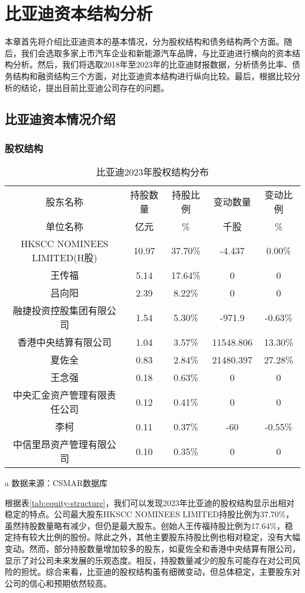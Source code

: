 \chapter{比亚迪资本结构分析}
本章首先将介绍比亚迪资本的基本情况，分为股权结构和债务结构两个方面。随后，我们会选取多家上市汽车企业和新能源汽车品牌，与比亚迪进行横向的资本结构分析。然后，我们将选取2018年至2023年的比亚迪财报数据，分析债务比率、债务结构和融资结构三个方面，对比亚迪资本结构进行纵向比较。最后，根据比较分析的结论，提出目前比亚迪公司存在的问题。
\section{比亚迪资本情况介绍}
\subsection{股权结构}
\begin{table}
  \centering
  \begin{threeparttable}[c]
    \caption{比亚迪2023年股权结构分布}
    \label{tab:equity-structure}
    \begin{tabular}{ccccc}
      \toprule
        股东名称 & 持股数量 & 持股比例 & 变动数量 & 变动比例 \\ 
        单位名称 & 亿元    &  \%      &  千股   &  \%      \\
      \midrule
        HKSCC NOMINEES LIMITED(H股) & 10.97  & 37.70\% & -4.437 & 0.00\% \\ 
        王传福 & 5.14  & 17.64\% & 0 & 0 \\ 
        吕向阳 & 2.39  & 8.22\% & 0 & 0 \\ 
        融捷投资控股集团有限公司 & 1.54  & 5.30\% & -971.9 & -0.63\% \\ 
        香港中央结算有限公司 & 1.04  & 3.57\% & 11548.806 & 13.30\% \\ 
        夏佐全 & 0.83  & 2.84\% & 21480.397 & 27.28\% \\ 
        王念强 & 0.18  & 0.63\% & 0 & 0 \\ 
        中央汇金资产管理有限责任公司 & 0.12  & 0.41\% & 0 & 0 \\ 
        李柯 & 0.11  & 0.37\% & -60 & -0.55\% \\ 
        中信里昂资产管理有限公司 & 0.10  & 0.35\% & 0 & 0 \\ 
      \bottomrule
    \end{tabular}
    \begin{tablenotes}
      \item [a] 数据来源：CSMAR数据库
    \end{tablenotes}
  \end{threeparttable}
\end{table}
根据表\eqref{tab:equity-structure}，我们可以发现2023年比亚迪的股权结构显示出相对稳定的特点。公司最大股东HKSCC NOMINEES LIMITED持股比例为37.70\%，虽然持股数量略有减少，但仍是最大股东。创始人王传福持股比例为17.64\%，稳定持有较大比例的股份。除此之外，其他主要股东持股比例也相对稳定，没有大幅变动。然而，部分持股数量增加较多的股东，如夏佐全和香港中央结算有限公司，显示了对公司未来发展的乐观态度。相反，持股数量减少的股东可能存在对公司风险的担忧。综合来看，比亚迪的股权结构虽有细微变动，但总体稳定，主要股东对公司的信心和预期依然较高。
